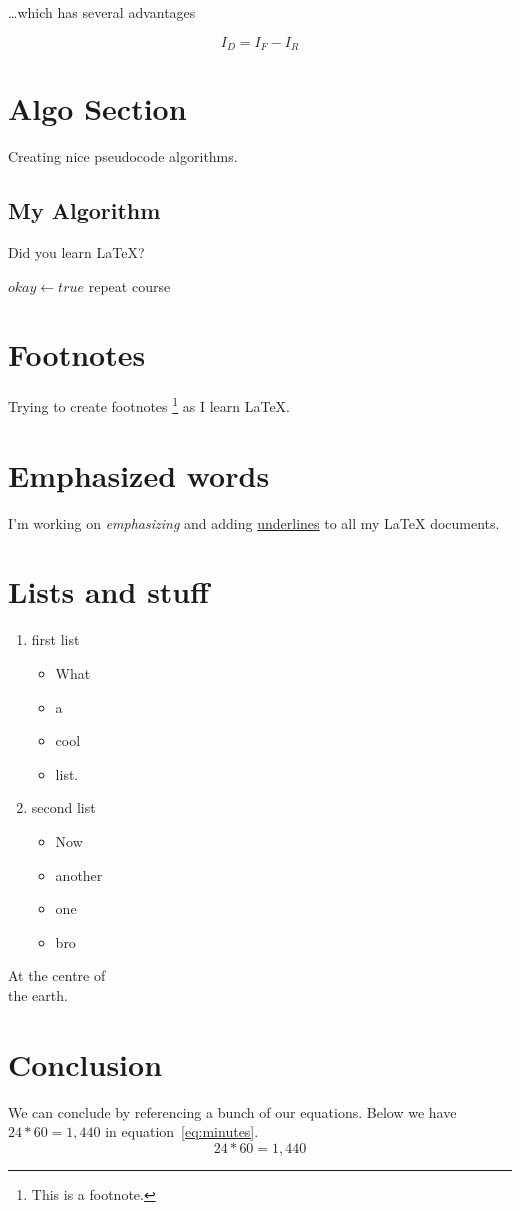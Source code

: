\documentclass{article}
\begin{document}
\ldots which has several advantages

\begin{equation}
I_D = I_F - I_R
\end{equation}

\section{Algo Section}

Creating nice pseudocode algorithms.

\subsection{My Algorithm}

Did you learn \LaTeX?

\begin{algorithmic}
	\State $okay \gets true$
\Else
		\State repeat course
	\EndWhile
\EndIf
\end{algorithmic}

\section{Footnotes}
Trying to create footnotes \footnote{This is a footnote.} as I learn \LaTeX.

\section{Emphasized words}
I'm working on \emph{emphasizing} and adding \underline{underlines} to all my \LaTeX{} documents.

\section{Lists and stuff}
\begin{enumerate}
\item first list
\begin{itemize}
\item What 
\item a 
\item cool
\item list.  
\end{itemize}
\item second list
\begin{itemize}
\item Now 
\item another
\item one
\item bro 
\end{itemize}
\end{enumerate}

\begin{center}
At the centre of \\ the earth.
\end{center}


\section{Conclusion}
We can conclude by referencing a bunch of our equations. Below we have $24 * 60 = 1,440$ in equation~\ref{eq:minutes}.
\begin{equation}
24 * 60 = 1,440 
\label{eq:minutes}
\end{equation}
\end{document}
